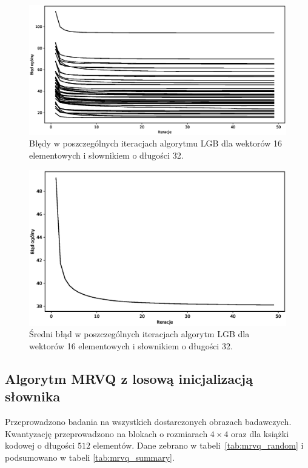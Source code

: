 \documentclass{article}
\begin{document}
\begin{figure}[H]
  \centering
  \centering
  \includegraphics[width=.9\linewidth]{images/lbg_4x4_32_50_iterations.eps}
  \caption{Błędy w poszczególnych iteracjach algorytmu LGB dla wektorów 16 elementowych i słownikiem o długości 32.}
  \label{fig:lbg_iterations}
\end{figure}

\begin{figure}[H]
  \centering
  \includegraphics[width=.9\linewidth]{images/lbg_4x4_32_mean_iterations.eps}
  \caption{Średni błąd w poszczególnych iteracjach algorytm LGB dla wektorów 16 elementowych i słownikiem o długości 32.}
  \label{fig:lbg_iterations_mean}
\end{figure}

\subsection{Algorytm MRVQ z losową inicjalizacją słownika}

Przeprowadzono badania na wszystkich dostarczonych obrazach badawczych. Kwantyzację przeprowadzono na blokach o rozmiarach $4 \times 4$ oraz dla książki
kodowej o długości $512$ elementów. Dane zebrano w \mbox{tabeli \ref{tab:mrvq_random}} i podsumowano w tabeli \mbox{\ref{tab:mrvq_summary}}.
\end{document}
